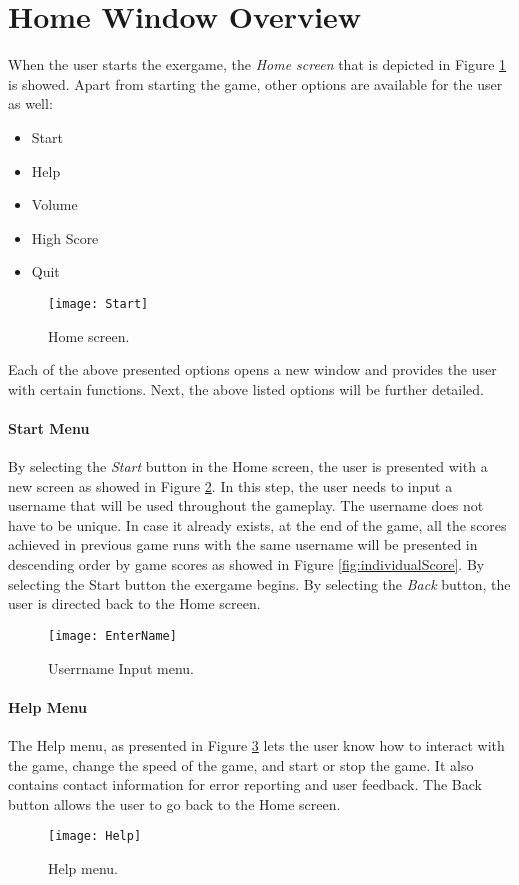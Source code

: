 \section{Home Window Overview}
When the user starts the exergame, the \textit{Home screen} that is depicted in Figure \ref{fig:start} is showed. Apart from starting the game, other options are available for the user as well:
\begin{itemize}
\item Start
\item Help
\item Volume
\item High Score
\item Quit
\end{itemize}
\begin{figure}[h]
    \centering
    \texttt{[image: Start]}
    \caption{Home screen.}
    \label{fig:start}
\end{figure}
Each of the above presented options opens a new window and provides the user with certain functions. Next, the above listed options will be further detailed.\pagebreak
\paragraph{Start Menu}
By selecting the \textit{Start} button in the Home screen, the user is presented with a new screen as showed in Figure \ref{fig:userinfo}. In this step, the user needs to input a username that will be used throughout the gameplay. The username does not have to be unique. In case it already exists, at the end of the game, all the scores achieved in previous game runs with the same username will be presented in descending order by game scores as showed in Figure \ref{fig:individualScore}. By selecting the Start button the exergame begins. By selecting the \textit{Back} button, the user is directed back to the Home screen.\\
\begin{figure}[h]
    \centering
    \texttt{[image: EnterName]}
    \caption{Userrname Input menu.}
    \label{fig:userinfo}
\end{figure}
\paragraph{Help Menu}
The Help menu, as presented in Figure \ref{fig:help} lets the user know how to interact with the game, change the speed of the game, and start or stop the game. It also contains contact information for error reporting and user feedback. The Back button allows the user to go back to the Home screen.
\begin{figure}[h]
    \centering
    \texttt{[image: Help]}
    \caption{Help menu.}
    \label{fig:help}
\end{figure}
